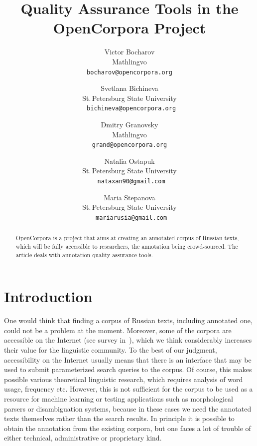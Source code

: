 \documentclass[a4paper]{article}
\begin{document}
\author{Victor Bocharov\\\small Mathlingvo\\\small\tt bocharov@opencorpora.org\and Svetlana Bichineva\\\small St.\,Petersburg State University\\\small\tt\ bichineva@opencorpora.org\and Dmitry Granovsky\\\small Mathlingvo\\\small\tt grand@opencorpora.org\and Natalia Ostapuk\\\small St.\,Petersburg State University\\\small\tt\ nataxan90@gmail.com\and Maria Stepanova\\\small St.\,Petersburg State University\\\small\tt\ mariarusia@gmail.com}
\title{Quality Assurance Tools in the OpenCorpora Project}
\date{}
\maketitle
\begin{abstract}
OpenCorpora is a project that aims at creating an annotated corpus of Russian texts, which will be fully accessible to researchers, the annotation being crowd-sourced. The article deals with annotation quality assurance tools.
\end{abstract}
\section{Introduction}
One would think that finding a corpus of Russian texts, including annotated one, could not be a problem at the moment. Moreover, some of the corpora are accessible on the Internet (see survey in~\cite{reznikova05}), which we think considerably increases their value for the linguistic community. To the best of our judgment, accessibility on the Internet usually means that there is an interface that may be used to submit parameterized search queries to the corpus. Of course, this makes possible various theoretical linguistic research, which requires analysis of word usage, frequency etc. However, this is not sufficient for the corpus to be used as a resource for machine learning or testing applications such as morphological parsers or disambiguation systems, because in these cases we need the annotated texts themselves rather than the search results. In principle it is possible to obtain the annotation from the existing corpora, but one faces a lot of trouble of either technical, administrative or proprietary kind.
\end{document}
